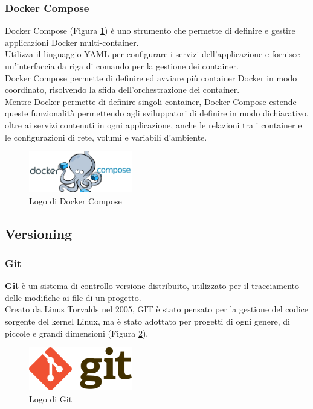 \subsubsection{Docker Compose}
Docker Compose (Figura \ref{fig:docker_compose}) è uno strumento che permette di definire e gestire applicazioni \gls{Docker}{} multi-container. \\
Utilizza il linguaggio YAML per configurare i servizi dell'applicazione e fornisce un'interfaccia da riga di comando per la gestione dei \gls{container}{}.\\
Docker Compose permette di definire ed avviare più \gls{container}{} \gls{Docker}{} in modo coordinato, risolvendo 
la sfida dell'orchestrazione dei \gls{container}{}.\\
Mentre \gls{Docker}{} permette di definire singoli \gls{container}{}, Docker Compose estende queste funzionalità permettendo agli sviluppatori 
di definire in modo dichiarativo, oltre ai servizi contenuti in ogni applicazione, anche le relazioni tra i \gls{container}{} e le configurazioni di rete, volumi e variabili d'ambiente.\\
\begin{figure}
    \centering
    \includegraphics[width=0.4\textwidth]{images/tecnologie/logo_docker_compose.png}
    \caption{Logo di Docker Compose}
    \label{fig:docker_compose}
\end{figure}
\pagebreak
\subsection{Versioning}
\subsubsection{Git}
\textbf{Git} è un sistema di controllo versione distribuito, utilizzato per il tracciamento delle modifiche ai file di un progetto.\\ 
Creato da Linus Torvalds nel 2005, GIT è stato pensato per la gestione del codice sorgente del kernel Linux, ma è stato adottato 
per progetti di ogni genere, di piccole e grandi dimensioni (Figura \ref{fig:git}).\\
\begin{figure}[hpp]
    \centering
    \includegraphics[width=0.4\textwidth]{images/tecnologie/logo_git.png}
    \caption{Logo di Git}
    \label{fig:git}
\end{figure}

